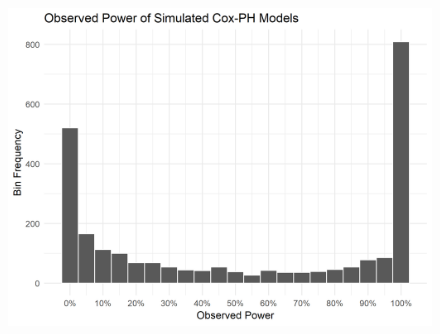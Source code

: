 





\begin{figure}
\centering
\caption[Observed Power of Simulated Cox-PH Models]{}
\label{fig:hist}
\includegraphics[width=\textwidth]{reports/figures/simulation-histogram.png}
\end{figure}

